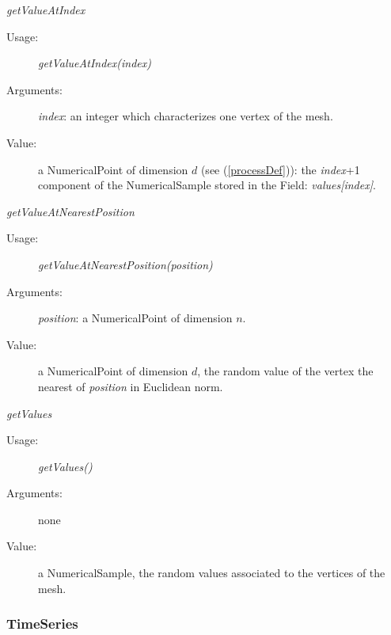 \begin{description}
\begin{description}
\item \textit{getValueAtIndex}
\begin{description}
\item[Usage:] \textit{getValueAtIndex(index)}
\item[Arguments:] \textit{index}: an integer which characterizes one vertex of the mesh.
\item[Value:] a NumericalPoint of dimension $d$ (see (\ref{processDef})): the \textit{index}+1 component of the NumericalSample stored in the Field: \textit{values[index]}.
\end{description}
\bigskip

\item \textit{getValueAtNearestPosition}
\begin{description}
\item[Usage:] \textit{getValueAtNearestPosition(position)}
\item[Arguments:] \textit{position}: a NumericalPoint of dimension $n$.
\item[Value:] a NumericalPoint of dimension $d$, the random value of the vertex the nearest of \textit{position} in Euclidean norm.
\end{description}
\bigskip

\item \textit{getValues}
\begin{description}
\item[Usage:] \textit{getValues()}
\item[Arguments:] none
\item[Value:] a NumericalSample, the random values associated to the vertices of the mesh.
\end{description}

\end{description}

\end{description}



\newpage

\subsubsection{TimeSeries}

